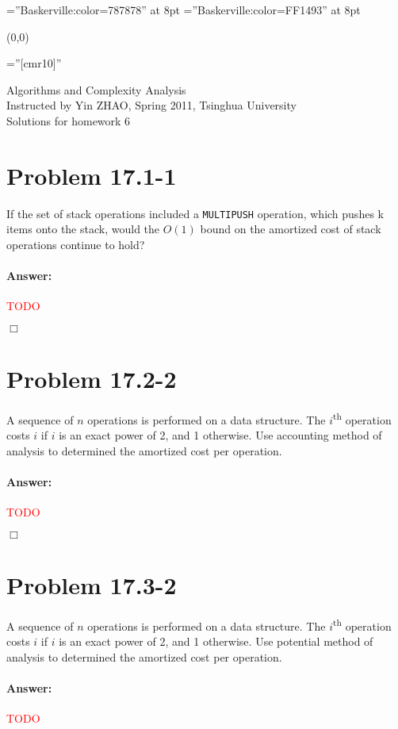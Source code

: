 \documentclass[a4paper,10pt]{article}
\newcommand{\problem}[1]{\section*{Problem #1}}
\newcommand{\answer}{\paragraph{Answer:}}
\newcommand{\qed}{\hfill \ensuremath{\Box}}
\newcommand{\todo}{\textcolor{red}{TODO}{} }
\begin{document}
\font\wm=''Baskerville:color=787878'' at 8pt
\font\wmtoday=''Baskerville:color=FF1493'' at 8pt
{\wm 
	\begin{textblock}{1}(0,0)
	\end{textblock}
}

\pagestyle{empty} %

\font\fb=''[cmr10]'' %

\par{\centering
  {\Large Algorithms and Complexity Analysis}
  \\\vspace{0.5em}
  { Instructed by Yin ZHAO, Spring 2011, Tsinghua University}
  \\\vspace{1.5em}
	{\Huge Solutions for homework 6\vspace{1em}
	}\bigskip\par}


\problem{17.1-1}

If the set of stack operations included a \texttt{MULTIPUSH} operation, which pushes k items onto the stack,
would the $O(1)$ bound on the amortized cost of stack operations continue to hold?

\answer

\todo

\qed

\problem{17.2-2}

A sequence of $n$ operations is performed on a data structure. The $i$\textsuperscript{th} operation costs $i$ if $i$ is an exact power of 2, and 1 otherwise. 
Use accounting method of analysis to determined the amortized cost per operation.


\answer

\todo

\qed


\problem{17.3-2}

A sequence of $n$ operations is performed on a data structure. The $i$\textsuperscript{th} operation costs $i$ if $i$ is an exact power of 2, and 1 otherwise. 
Use potential method of analysis to determined the amortized cost per operation.


\answer

\todo
\end{document}
